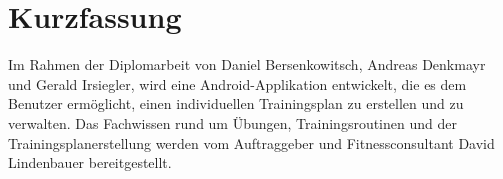 \documentclass[FIPLY_base.tex]{subfiles}
\begin{document}

\section{Kurzfassung}
Im Rahmen der Diplomarbeit von Daniel Bersenkowitsch, Andreas Denkmayr und Gerald Irsiegler, wird eine Android-Applikation entwickelt, die es dem Benutzer ermöglicht, einen individuellen Trainingsplan zu erstellen und zu verwalten.
Das Fachwissen rund um Übungen, Trainingsroutinen und der Trainingsplanerstellung werden vom Auftraggeber und Fitnessconsultant David Lindenbauer bereitgestellt.
\end{document}
